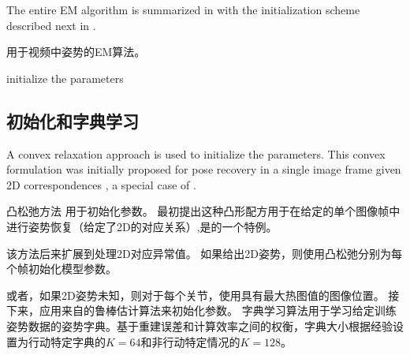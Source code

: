 The entire EM algorithm is summarized in  with the initialization scheme described next in .

\begin{algorithm}[t]\label{alg:em}
\LinesNumbered
\caption{用于视频中姿势的EM算法。}
\vspace{0.3em}
\vspace{0.3em}
initialize the parameters 
\vspace{0.5em}
\end{algorithm}

\subsection{初始化和字典学习}\label{sec:initialization}

A convex relaxation approach \cite{zhou20153d,zhou2015sparse} is used to initialize the parameters.
This convex formulation was initially proposed for pose recovery in a single image frame given 
2D correspondences \cite{zhou20153d}, a special case of .

凸松弛方法 \cite{zhou20153d,zhou2015sparse}用于初始化参数。
最初提出这种凸形配方用于在给定的单个图像帧中进行姿势恢复\cite{zhou20153d}（给定了2D的对应关系）,是的一个特例。

该方法后来扩展到处理2D对应异常值\cite{zhou2015sparse}。 如果给出2D姿势，则使用凸松弛分别为每个帧初始化模型参数\cite{zhou2015sparse}。

或者，如果2D姿势未知，则对于每个关节，使用具有最大热图值的图像位置。
接下来，应用来自\cite{zhou2015sparse}的鲁棒估计算法来初始化参数。
字典学习算法\cite{zhou2015sparse}用于学习给定训练姿势数据的姿势字典。基于重建误差和计算效率之间的权衡，字典大小根据经验设置为行动特定字典的$K=64$和非行动特定情况的$K=128$。